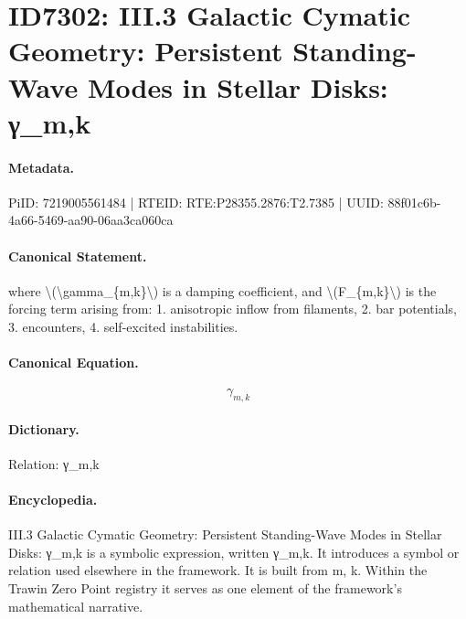 \section*{ID7302: III.3 Galactic Cymatic Geometry: Persistent Standing-Wave Modes in Stellar Disks: γ\_m,k}
\paragraph{Metadata.}
PiID: 7219005561484 | RTEID: RTE:P28355.2876:T2.7385 | UUID: 88f01c6b-4a66-5469-aa90-06aa3ca060ca

\paragraph{Canonical Statement.}
where \textbackslash{}(\textbackslash{}gamma\_\{m,k\}\textbackslash{}) is a damping coefficient, and \textbackslash{}(F\_\{m,k\}\textbackslash{}) is the forcing term arising from: 1. anisotropic inflow from filaments, 2. bar potentials, 3. encounters, 4. self-excited instabilities.

\paragraph{Canonical Equation.}
\[
\gamma_{m,k}
\]

\paragraph{Dictionary.}
Relation: γ\_m,k

\paragraph{Encyclopedia.}
III.3 Galactic Cymatic Geometry: Persistent Standing-Wave Modes in Stellar Disks: γ\_m,k is a symbolic expression, written γ\_m,k. It introduces a symbol or relation used elsewhere in the framework. It is built from m, k. Within the Trawin Zero Point registry it serves as one element of the framework's mathematical narrative.
